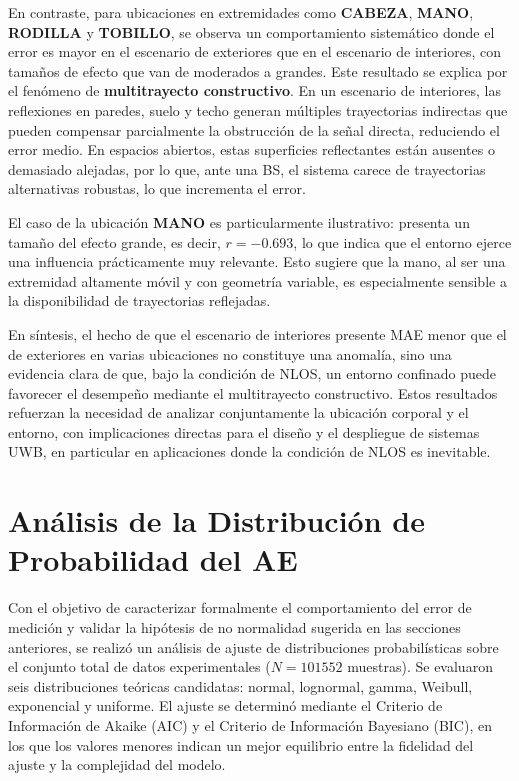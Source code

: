 En contraste, para ubicaciones en extremidades como \textbf{CABEZA}, \textbf{MANO}, \textbf{RODILLA} y \textbf{TOBILLO}, se observa un comportamiento sistemático donde el error es mayor en el escenario de exteriores que en el escenario de interiores, con tamaños de efecto que van de moderados a grandes. Este resultado se explica por el fenómeno de \textbf{multitrayecto constructivo}. En un escenario de interiores, las reflexiones en paredes, suelo y techo generan múltiples trayectorias indirectas que pueden compensar parcialmente la obstrucción de la señal directa, reduciendo el error medio. En espacios abiertos, estas superficies reflectantes están ausentes o demasiado alejadas, por lo que, ante una BS, el sistema carece de trayectorias alternativas robustas, lo que incrementa el error.

El caso de la ubicación \textbf{MANO} es particularmente ilustrativo: presenta un tamaño del efecto grande, es decir, $r = -0.693$, lo que indica que el entorno ejerce una influencia prácticamente muy relevante. Esto sugiere que la mano, al ser una extremidad altamente móvil y con geometría variable, es especialmente sensible a la disponibilidad de trayectorias reflejadas.

En síntesis, el hecho de que el escenario de interiores presente MAE menor que el de exteriores en varias ubicaciones no constituye una anomalía, sino una evidencia clara de que, bajo la condición de NLOS, un entorno confinado puede favorecer el desempeño mediante el multitrayecto constructivo. Estos resultados refuerzan la necesidad de analizar conjuntamente la ubicación corporal y el entorno, con  implicaciones directas para el diseño y el despliegue de sistemas UWB, en particular en aplicaciones donde la condición de NLOS es inevitable.

\section{Análisis de la Distribución de Probabilidad del AE}
\label{sec:analisis_distribucion_mae}

Con el objetivo de caracterizar formalmente el comportamiento del error de medición y validar la hipótesis de no normalidad sugerida en las secciones anteriores, se realizó un análisis de ajuste de distribuciones probabilísticas sobre el conjunto total de datos experimentales ($N=101552$ muestras). Se evaluaron seis distribuciones teóricas candidatas: normal, lognormal, gamma, Weibull, exponencial y uniforme. El ajuste se determinó mediante el Criterio de Información de Akaike (AIC) y el Criterio de Información Bayesiano (BIC), en los que los valores menores indican un mejor equilibrio entre la fidelidad del ajuste y la complejidad del modelo.

